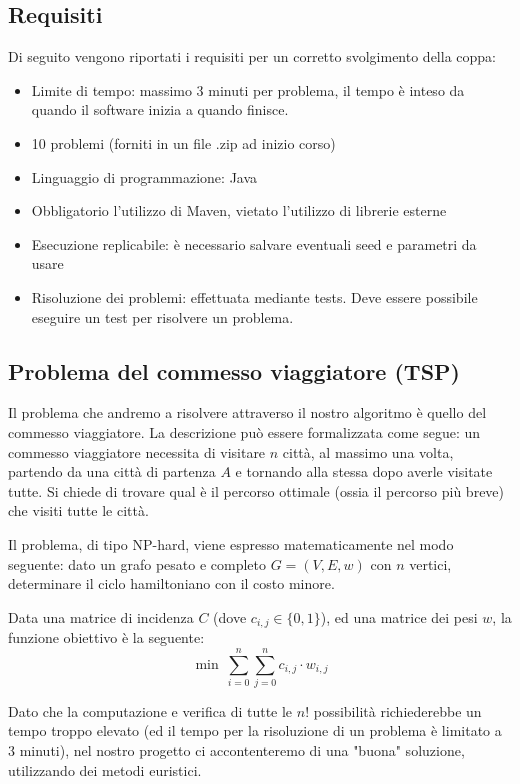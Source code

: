 \documentclass{article}
\newenvironment{itm}{
\begin{itemize}
  \setlength{\itemsep}{2pt}
  \setlength{\parskip}{2pt}
}{\end{itemize}}
\begin{document}
\subsection{Requisiti}
Di seguito vengono riportati i requisiti per un corretto svolgimento della coppa:
\begin{itm}
\item Limite di tempo: massimo 3 minuti per problema,
il tempo è inteso da quando il software inizia a quando finisce.
\item 10 problemi (forniti in un file .zip ad inizio corso)
\item Linguaggio di programmazione: Java
\item Obbligatorio l'utilizzo di Maven, vietato l'utilizzo di librerie esterne
\item Esecuzione replicabile: è necessario salvare eventuali seed e parametri da usare
\item Risoluzione dei problemi: effettuata mediante tests. Deve essere possibile
eseguire un test per risolvere un problema.
\end{itm}

\subsection{Problema del commesso viaggiatore (TSP)}
Il problema che andremo a risolvere attraverso il nostro
 algoritmo è quello del commesso viaggiatore.
La descrizione può essere formalizzata come segue:
un commesso viaggiatore necessita di visitare $n$ città, al
massimo una volta, partendo da una città di partenza $A$ e tornando
alla stessa dopo averle visitate tutte. Si chiede di trovare
qual è il percorso ottimale (ossia il percorso più breve)
che visiti tutte le città. 

Il problema, di tipo NP-hard, viene espresso matematicamente nel modo seguente:
dato un grafo pesato e completo $G = (V, E, w)$ con $n$ vertici, determinare il
ciclo hamiltoniano con il costo minore.

Data una matrice di incidenza $C$ (dove $c_{i,j} \in \{0,1\}$),
ed una matrice dei pesi $w$,
la funzione obiettivo è la seguente:
\begin{equation}
    \min \ \sum_{i = 0}^n \sum_{j = 0}^n c_{i,j} \cdot w_{i,j}
\end{equation}

Dato che la computazione e verifica di tutte le $n!$ possibilità richiederebbe
un tempo troppo elevato (ed il tempo per la risoluzione di un 
problema è limitato a 3 minuti),
nel nostro progetto ci accontenteremo di una "buona" soluzione,
utilizzando dei metodi euristici.
\end{document}
